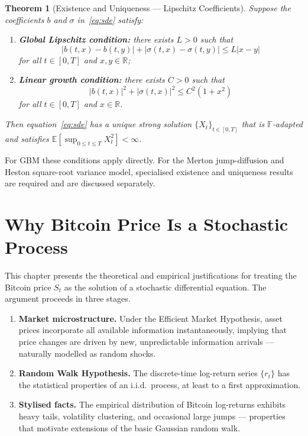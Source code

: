 \documentclass[12pt, a4paper, oneside]{report}
\theoremstyle{plain}
\newtheorem{theorem}{Theorem}[chapter]
\theoremstyle{definition}
\theoremstyle{remark}
\newcommand{\R}{\mathbb{R}}
\newcommand{\E}{\mathbb{E}}
\begin{document}
\begin{theorem}[Existence and Uniqueness --- Lipschitz Coefficients]
\label{thm:sde_exist}
Suppose the coefficients $b$ and $\sigma$ in~\eqref{eq:sde} satisfy:
\begin{enumerate}[leftmargin=1.25cm, label=\textup{(C\arabic*)}]
  \item \textbf{Global Lipschitz condition:} there exists $L > 0$ such that
    \[
      |b(t,x) - b(t,y)| + |\sigma(t,x) - \sigma(t,y)| \leq L|x - y|
    \]
    for all $t \in [0,T]$ and $x, y \in \R$;
  \item \textbf{Linear growth condition:} there exists $C > 0$ such that
    \[
      |b(t,x)|^2 + |\sigma(t,x)|^2 \leq C^2(1 + x^2)
    \]
    for all $t \in [0,T]$ and $x \in \R$.
\end{enumerate}
Then equation~\eqref{eq:sde} has a \emph{unique strong solution} $\{X_t\}_{t \in [0,T]}$
that is $\mathbb{F}$-adapted and satisfies
$\E\!\left[\sup_{0 \leq t \leq T} X_t^2\right] < \infty$.
\end{theorem}

For GBM these conditions apply directly. For the Merton jump-diffusion and
Heston square-root variance model, specialised existence and uniqueness results
are required and are discussed separately.

\chapter{Why Bitcoin Price Is a Stochastic Process}
\label{ch:stochastic}

This chapter presents the theoretical and empirical justifications for treating
the Bitcoin price $S_t$ as the solution of a stochastic differential equation.
The argument proceeds in three stages.

\begin{enumerate}[leftmargin=1.25cm, label=\arabic*.]
  \item \textbf{Market microstructure.}  Under the Efficient Market Hypothesis,
    asset prices incorporate all available information instantaneously, implying
    that price changes are driven by new, unpredictable information arrivals ---
    naturally modelled as random shocks.
  \item \textbf{Random Walk Hypothesis.}  The discrete-time log-return series
    $\{r_t\}$ has the statistical properties of an i.i.d.\ process, at least to
    a first approximation.
  \item \textbf{Stylised facts.}  The empirical distribution of Bitcoin log-returns
    exhibits heavy tails, volatility clustering, and occasional large jumps ---
    properties that motivate extensions of the basic Gaussian random walk.
\end{enumerate}
\end{document}
